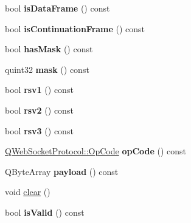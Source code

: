 \begin{DoxyCompactItemize}
\item 
\mbox{\label{class_q_web_socket_frame_a46a65520102fbe43ceff2b593c46e8e8}} 
bool {\bfseries is\+Data\+Frame} () const
\item 
\mbox{\label{class_q_web_socket_frame_a2fd37d6c6c8aee0b34f56f472418e813}} 
bool {\bfseries is\+Continuation\+Frame} () const
\item 
\mbox{\label{class_q_web_socket_frame_ad2aedb9d5cb8605cdea7c5469c5a20f4}} 
bool {\bfseries has\+Mask} () const
\item 
\mbox{\label{class_q_web_socket_frame_a38c64be863c11362d34ed8c7fe92cf86}} 
quint32 {\bfseries mask} () const
\item 
\mbox{\label{class_q_web_socket_frame_a602e1acf5f9396a98160597ae44557e0}} 
bool {\bfseries rsv1} () const
\item 
\mbox{\label{class_q_web_socket_frame_a98173a14ea6170b1996558218183c6f5}} 
bool {\bfseries rsv2} () const
\item 
\mbox{\label{class_q_web_socket_frame_aadb63b50a106d50ebf9bbdde10f6fd7a}} 
bool {\bfseries rsv3} () const
\item 
\mbox{\label{class_q_web_socket_frame_a3233cec712a5c2184e9d115475d132b6}} 
\mbox{\hyperlink{namespace_q_web_socket_protocol_a93d3033ae9be614a2bc8f76c792e2e14}{Q\+Web\+Socket\+Protocol\+::\+Op\+Code}} {\bfseries op\+Code} () const
\item 
\mbox{\label{class_q_web_socket_frame_a48df171ac3c141b90a5320c215e7f902}} 
Q\+Byte\+Array {\bfseries payload} () const
\item 
void \mbox{\hyperlink{class_q_web_socket_frame_a27035db6c866b11f552650282bf9cc89}{clear}} ()
\item 
\mbox{\label{class_q_web_socket_frame_afdfea01d1c4b6dec18d3c93de96c13e5}} 
bool {\bfseries is\+Valid} () const
\end{DoxyCompactItemize}
